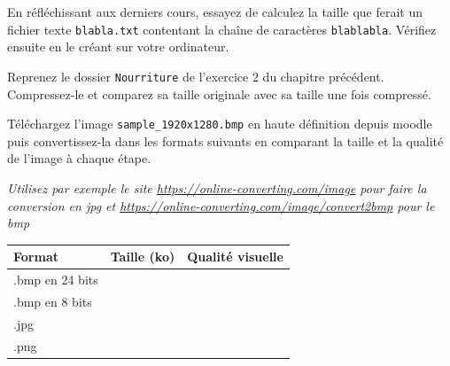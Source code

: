 \documentclass[11pt, a4paper]{book}
\begin{document}
\begin{exercice}
En réfléchissant aux derniers cours, essayez de calculez la taille que ferait un fichier texte \texttt{blabla.txt} contentant la chaîne de caractères \texttt{blablabla}.
Vérifiez ensuite en le créant sur votre ordinateur.
\end{exercice}


\begin{exercice}
Reprenez le dossier \texttt{Nourriture} de l'exercice 2 du chapitre précédent. Compressez-le et comparez sa taille originale avec sa taille une fois compressé.
\end{exercice}

\begin{exercice}
Téléchargez l'image \texttt{sample\_1920x1280.bmp} en haute définition depuis moodle puis convertissez-la dans les formats suivants en comparant la taille et la qualité de l'image à chaque étape. 

\textit{Utilisez par exemple le site \url{https://online-converting.com/image} pour faire la conversion en jpg et \url{https://online-converting.com/image/convert2bmp} pour le bmp}
\begin{center}
   \begin{tabular}{| l || c | r | }
     \hline
     Format & Taille (ko) & Qualité visuelle \\ \hline
     .bmp en 24 bits &  &  \\ \hline
     .bmp en 8 bits &  &  \\ \hline
     .jpg &  &  \\ \hline
     .png &  &  \\
     \hline
   \end{tabular}
\end{center}
\end{exercice}
\end{document}

